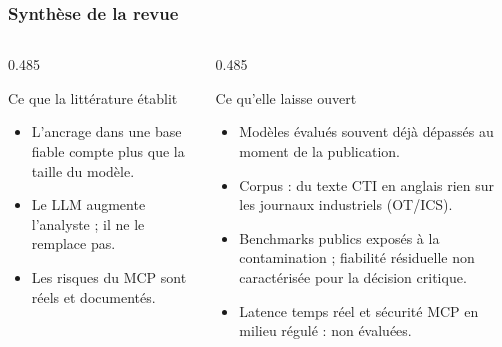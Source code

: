 \documentclass[aspectratio=169,11pt]{beamer}
\begin{document}
\begin{frame}
  \frametitle{Synthèse de la revue}
  \begin{columns}[T]
    \begin{column}{0.485\textwidth}
      \begin{exampleblock}{Ce que la littérature établit}
        \footnotesize
        \begin{itemize}\setlength\itemsep{0.35em}
          \item L'ancrage dans une base fiable compte plus que la
            taille du modèle.
          \item Le LLM augmente l'analyste ; il ne le remplace pas.
          \item Les risques du MCP sont réels et documentés.
        \end{itemize}
      \end{exampleblock}
    \end{column}
    \begin{column}{0.485\textwidth}
      \begin{block}{Ce qu'elle laisse ouvert}
        \footnotesize
        \begin{itemize}\setlength\itemsep{0.35em}
          \item Modèles évalués souvent déjà dépassés au moment de la
            publication.
          \item Corpus : du texte CTI en anglais rien sur les
            journaux industriels (OT/ICS).
          \item Benchmarks publics exposés à la contamination ;
            fiabilité résiduelle non caractérisée pour la décision
            critique.
          \item Latence temps réel et sécurité MCP en milieu
            régulé : non évaluées.
        \end{itemize}
      \end{block}
    \end{column}
  \end{columns}
  \vspace{0.12cm}
  \begin{center}
  \end{center}
\end{frame}
\end{document}
